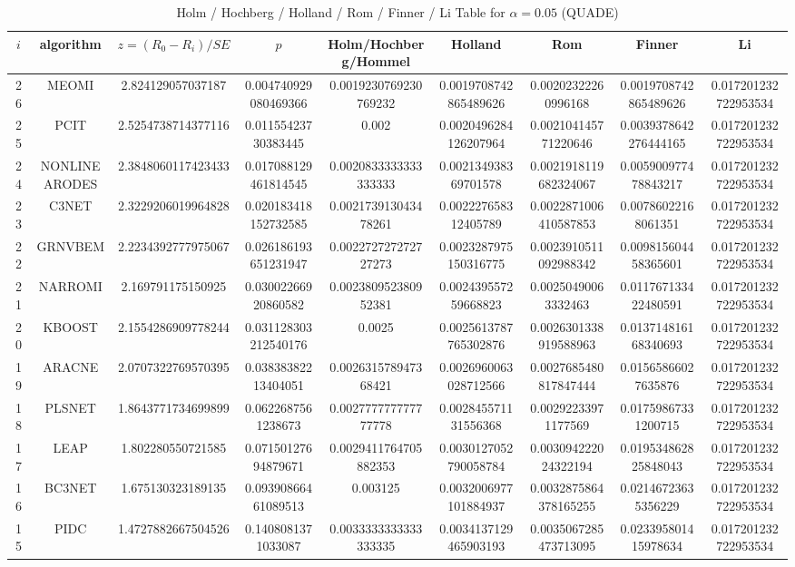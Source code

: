 \documentclass[a4paper,10pt]{article}
\begin{document}
\begin{landscape}
\begin{table}[!htp]
\centering\scriptsize
\caption{Holm / Hochberg / Holland / Rom / Finner / Li Table for $\alpha=0.05$ (QUADE)}
\begin{tabular}{ccccccccc}
$i$&algorithm&$z=(R_0 - R_i)/SE$&$p$&Holm/Hochberg/Hommel&Holland&Rom&Finner&Li\\
\hline
26&MEOMI&2.824129057037187&0.004740929080469366&0.0019230769230769232&0.0019708742865489626&0.00202322260996168&0.0019708742865489626&0.017201232722953534\\
25&PCIT&2.5254738714377116&0.01155423730383445&0.002&0.0020496284126207964&0.002104145771220646&0.0039378642276444165&0.017201232722953534\\
24&NONLINEARODES&2.3848060117423433&0.017088129461814545&0.0020833333333333333&0.002134938369701578&0.0021918119682324067&0.005900977478843217&0.017201232722953534\\
23&C3NET&2.3229206019964828&0.020183418152732585&0.002173913043478261&0.002227658312405789&0.0022871006410587853&0.00786022168061351&0.017201232722953534\\
22&GRNVBEM&2.2234392777975067&0.026186193651231947&0.002272727272727273&0.0023287975150316775&0.0023910511092988342&0.009815604458365601&0.017201232722953534\\
21&NARROMI&2.169791175150925&0.03002266920860582&0.002380952380952381&0.002439557259668823&0.00250490063332463&0.011767133422480591&0.017201232722953534\\
20&KBOOST&2.1554286909778244&0.031128303212540176&0.0025&0.0025613787765302876&0.0026301338919588963&0.013714816168340693&0.017201232722953534\\
19&ARACNE&2.0707322769570395&0.03838382213404051&0.002631578947368421&0.0026960063028712566&0.0027685480817847444&0.01565866027635876&0.017201232722953534\\
18&PLSNET&1.8643771734699899&0.0622687561238673&0.002777777777777778&0.002845571131556368&0.00292233971177569&0.01759867331200715&0.017201232722953534\\
17&LEAP&1.802280550721585&0.07150127694879671&0.0029411764705882353&0.0030127052790058784&0.003094222024322194&0.019534862825848043&0.017201232722953534\\
16&BC3NET&1.675130323189135&0.09390866461089513&0.003125&0.0032006977101884937&0.0032875864378165255&0.02146723635356229&0.017201232722953534\\
15&PIDC&1.4727882667504526&0.1408081371033087&0.0033333333333333335&0.0034137129465903193&0.0035067285473713095&0.023395801415978634&0.017201232722953534\\

\end{tabular}
\end{table}
\end{landscape}
\end{document}
